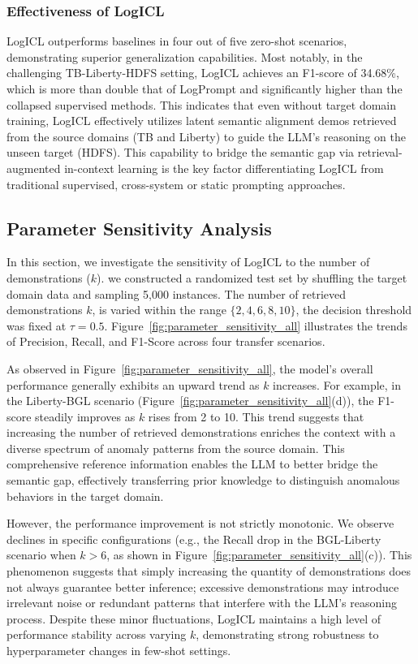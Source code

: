 \documentclass[lettersize,journal]{IEEEtran}
\begin{document}
\subsubsection{Effectiveness of LogICL}
LogICL outperforms baselines in four out of five zero-shot scenarios, demonstrating superior generalization capabilities. Most notably, in the challenging TB-Liberty-HDFS setting, LogICL achieves an F1-score of 34.68\%, which is more than double that of LogPrompt and significantly higher than the collapsed supervised methods. This indicates that even without target domain training, LogICL effectively utilizes latent semantic alignment demos retrieved from the source domains (TB and Liberty) to guide the LLM's reasoning on the unseen target (HDFS). This capability to bridge the semantic gap via retrieval-augmented in-context learning is the key factor differentiating LogICL from traditional supervised, cross-system or static prompting approaches.

\subsection{Parameter Sensitivity Analysis}
In this section, we investigate the sensitivity of LogICL to the number of demonstrations ($k$). we constructed a randomized test set by shuffling the target domain data and sampling 5,000 instances. The number of retrieved demonstrations $k$, is varied within the range $\{2, 4, 6, 8, 10\}$, the decision threshold was fixed at $\tau=0.5$. Figure~\ref{fig:parameter_sensitivity_all} illustrates the trends of Precision, Recall, and F1-Score across four transfer scenarios.

As observed in Figure~\ref{fig:parameter_sensitivity_all}, the model's overall performance generally exhibits an upward trend as $k$ increases. For example, in the Liberty-BGL scenario (Figure~\ref{fig:parameter_sensitivity_all}(d)), the F1-score steadily improves as $k$ rises from 2 to 10. This trend suggests that increasing the number of retrieved demonstrations enriches the context with a diverse spectrum of anomaly patterns from the source domain. This comprehensive reference information enables the LLM to better bridge the semantic gap, effectively transferring prior knowledge to distinguish anomalous behaviors in the target domain.

However, the performance improvement is not strictly monotonic. We observe declines in specific configurations (e.g., the Recall drop in the BGL-Liberty scenario when $k>6$, as shown in Figure~\ref{fig:parameter_sensitivity_all}(c)). This phenomenon suggests that simply increasing the quantity of demonstrations does not always guarantee better inference; excessive demonstrations may introduce irrelevant noise or redundant patterns that interfere with the LLM's reasoning process. Despite these minor fluctuations, LogICL maintains a high level of performance stability across varying $k$, demonstrating strong robustness to hyperparameter changes in few-shot settings.
\end{document}
